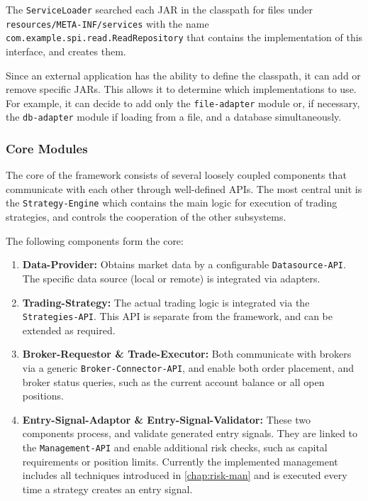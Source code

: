 The \verb|ServiceLoader| searched each JAR in the classpath for files under \verb|resources/META-INF/services| with the name \\\verb|com.example.spi.read.ReadRepository| that contains the implementation of this interface, and creates them.

Since an external application has the ability to define the classpath, it can add or remove specific JARs.
This allows it to determine which implementations to use.
For example, it can decide to add only the \verb|file-adapter| module or, if necessary, the \verb|db-adapter| module if loading from a file, and a database simultaneously.

\subsubsection{Core Modules}

The core of the framework consists of several loosely coupled components that communicate with each other through well-defined APIs.
The most central unit is the \verb|Strategy-Engine| which contains the main logic for execution of trading strategies, and controls the cooperation of the other subsystems.

The following components form the core:

\begin{enumerate}
    \item \textbf{Data-Provider:} Obtains market data by a configurable \verb|Datasource-API|.
    The specific data source (local or remote) is integrated via adapters.
    \item \textbf{Trading-Strategy:} The actual trading logic is integrated via the \verb|Strategies-API|.
    This API is separate from the framework, and can be extended as required.
    \item \textbf{Broker-Requestor \& Trade-Executor:} Both communicate with brokers via a generic \verb|Broker-Connector-API|, and enable both order placement, and broker status queries, such as the current account balance or all open positions.
    \item \textbf{Entry-Signal-Adaptor \& Entry-Signal-Validator:} These two components process, and validate generated entry signals.
    They are linked to the \verb|Management-API| and enable additional risk checks, such as capital requirements or position limits.
    Currently the implemented management includes all techniques introduced in \autoref{chap:risk-man} and is executed every time a strategy creates an entry signal.
\end{enumerate}

